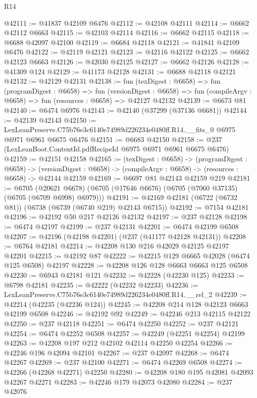 \begin{lexlean}{R14}
\begin{coremodule}
@42111 := @41837 @42109 @6476
@42112 := @42108 @42111
@42114 := @6662 @42112 @6663
@42115 := @42103 @42114
@42116 := @6662 @42115
@42118 := @6688 @42097 @42100
@42119 := @6684 @42118
@42121 := @41841 @42109 @6476
@42122 := @42119 @42121
@42123 := @42116 @42122
@42125 := @6662 @42123 @6663
@42126 := @42030 @42125
@42127 := @6662 @42126
@42128 := @41309 @124
@42129 := @41173 @42128
@42131 := @6688 @42118 @42121
@42132 := @42129 @42131
@42138 := fun (texDigest : @6658) =>
  fun (programDigest : @6658) =>
  fun (versionDigest : @6658) =>
  fun (compileArgv : @6658) => fun (resources : @6658) => @42127 @42132
@42139 := @6673 @81
@42140 := @6474 @6976
@42143 := @42140 (@37299 (@37136 @6681))
@42144 := @42139 @42143
@42150 := LexLeanPreserve.C75b76e3c6140e74989d226234e0480ff.R14.__fits_0
    @6975
    @6971
    @6961
    @6675
    @6476
@42151 := @6683 @42150
@42158 := @237 (LexLeanBoot.ContentId.pdfRecipeId @6975 @6971 @6961 @6675 @6476)
@42159 := @42151 @42158
@42165 := (texDigest : @6658) ->
  (programDigest : @6658) ->
  (versionDigest : @6658) -> (compileArgv : @6658) -> (resources : @6658) -> @42144 @42159
@42169 := @6697 @81 @42143 @42159 @219
@42181 := @6705
    (@20621 @6678)
    (@6705 (@17646 @6676) (@6705 (@7060 @37135) (@6705 (@6709 @6998) @6979)))
@42191 := @42169 @42181 (@6722 (@6732 @81)) (@6738 (@6739 (@6740 @219) @42143 @6715))
@42192 := @7154 @42181
@42196 := @42192 @50 @217 @42126 @42132
@42197 := @237 @42128
@42198 := @6474 @42197
@42199 := @237 @42131
@42201 := @6474 @42199 @6508
@42207 := @42196 (@42198 @42201) (@237 (@41177 @42128 @42131))
@42208 := @6764 @42181
@42214 := @42208 @130 @216 @42029 @42125 @42197 @42201
@42215 := @42192 @87
@42222 := @42215 @129 @6665 @42028 (@6474 @125 @6508) @42197
@42228 := @42208 @126 @128 @6663 @6663 @125 @6508
@42230 := @6943 @42181 @121
@42232 := @42228 (@42230 @125)
@42233 := @6798 @42181
@42235 := @42222 (@42232 @42233)
@42236 := LexLeanPreserve.C75b76e3c6140e74989d226234e0480ff.R14.__rel_2
@42239 := @42214 (@42235 (@42236 @124))
@42245 := @42208 @214 @128 @42123 @6663 @42199 @6508
@42246 := @42192 @92
@42249 := @42246 @213 @42115 @42122
@42250 := @237 @42118
@42251 := @6474 @42250
@42252 := @237 @42121
@42254 := @6474 @42252 @6508
@42257 := @42249 (@42251 @42254) @42199
@42263 := @42208 @197 @212 @42102 @42114 @42250 @42254
@42266 := @42246 @196 @42094 @42101
@42267 := @237 @42097
@42268 := @6474 @42267
@42269 := @237 @42100
@42271 := @6474 @42269 @6508
@42274 := @42266 (@42268 @42271) @42250
@42280 := @42208 @180 @195 @42081 @42093 @42267 @42271
@42283 := @42246 @179 @42073 @42080
@42284 := @237 @42076

\end{coremodule}
\end{lexlean}
